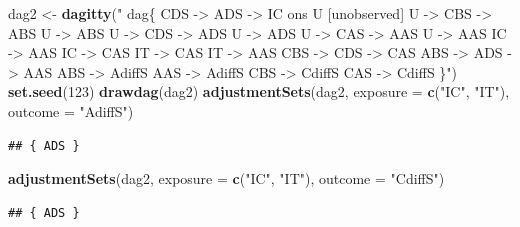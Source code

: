 \documentclass[10pt,dvipsnames,enabledeprecatedfontcommands]{scrartcl}
\newenvironment{Shaded}{\begin{snugshade}}{\end{snugshade}}
\newcommand{\KeywordTok}[1]{\textcolor[rgb]{0.13,0.29,0.53}{\textbf{#1}}}
\newcommand{\DataTypeTok}[1]{\textcolor[rgb]{0.13,0.29,0.53}{#1}}
\newcommand{\DecValTok}[1]{\textcolor[rgb]{0.00,0.00,0.81}{#1}}
\newcommand{\StringTok}[1]{\textcolor[rgb]{0.31,0.60,0.02}{#1}}
\newcommand{\NormalTok}[1]{#1}
\begin{document}
\begin{Shaded}
\begin{Highlighting}[]
\NormalTok{dag2 <-}\StringTok{ }\KeywordTok{dagitty}\NormalTok{(}\StringTok{"}
\StringTok{  dag\{}
\StringTok{                CDS -> ADS -> IC  ons}
\StringTok{                U [unobserved]   }
\StringTok{                U -> CBS -> ABS  }
\StringTok{                U -> ABS        }
\StringTok{                U -> CDS -> ADS  }
\StringTok{                U -> ADS         }
\StringTok{                U -> CAS -> AAS    }
\StringTok{                U -> AAS                        }
\StringTok{                IC -> AAS        }
\StringTok{                IC -> CAS        }
\StringTok{                IT -> CAS        }
\StringTok{                IT -> AAS}
\StringTok{                CBS -> CDS -> CAS}
\StringTok{                ABS -> ADS -> AAS}
\StringTok{                ABS -> AdiffS}
\StringTok{                AAS -> AdiffS}
\StringTok{                CBS -> CdiffS}
\StringTok{                CAS -> CdiffS}
\StringTok{                \}"}\NormalTok{)}
\KeywordTok{set.seed}\NormalTok{(}\DecValTok{123}\NormalTok{)}
\KeywordTok{drawdag}\NormalTok{(dag2)}
\KeywordTok{adjustmentSets}\NormalTok{(dag2, }\DataTypeTok{exposure =} \KeywordTok{c}\NormalTok{(}\StringTok{"IC"}\NormalTok{, }\StringTok{"IT"}\NormalTok{), }\DataTypeTok{outcome =} \StringTok{"AdiffS"}\NormalTok{)}
\end{Highlighting}
\end{Shaded}

\begin{verbatim}
## { ADS }
\end{verbatim}

\begin{Shaded}
\begin{Highlighting}[]
\KeywordTok{adjustmentSets}\NormalTok{(dag2, }\DataTypeTok{exposure =} \KeywordTok{c}\NormalTok{(}\StringTok{"IC"}\NormalTok{, }\StringTok{"IT"}\NormalTok{), }\DataTypeTok{outcome =} \StringTok{"CdiffS"}\NormalTok{)}
\end{Highlighting}
\end{Shaded}

\begin{verbatim}
## { ADS }
\end{verbatim}
\end{document}
